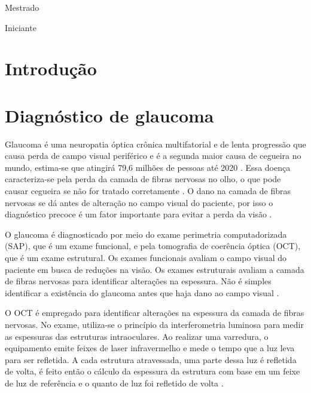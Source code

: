 \documentclass[conference]{IEEEtran}
\begin{document}
\renewcommand\IEEEkeywordsname{Classifica\c{c}\~{a}o}
\begin{IEEEkeywords}
	\label{classificacao}
	Mestrado
\end{IEEEkeywords}

\renewcommand\IEEEkeywordsname{Categoria}
\begin{IEEEkeywords}
	\label{Categoria}
	Iniciante 
\end{IEEEkeywords}

\IEEEpeerreviewmaketitle


\section{Introdução}


\section{Diagnóstico de glaucoma}


Glaucoma é uma neuropatia óptica crônica multifatorial e de lenta progressão que causa perda de campo visual periférico e é a segunda maior causa de cegueira no mundo, estima-se que atingirá 79,6 milhões de pessoas até 2020 \cite{Quigley2006}. Essa doença caracteriza-se pela perda da camada de fibras nervosas no olho, o que pode causar cegueira se não for tratado corretamente \cite{Quigley2011}. O dano na camada de fibras nervosas se dá antes de alteração no campo visual do paciente, por isso o diagnóstico precoce é um fator importante para evitar a perda da visão \cite{Malik2012}.

O glaucoma é diagnosticado por meio do exame perimetria computadorizada (SAP), que é um exame funcional, e pela tomografia de coerência óptica (OCT), que é um exame estrutural. Os exames funcionais avaliam o campo visual do paciente em busca de reduções na visão. Os exames estruturais avaliam a camada de fibras nervosas para identificar alterações na espessura. Não é simples identificar a existência do glaucoma antes que haja dano ao campo visual \cite{Populacoes2009}.

O OCT é empregado para identificar alterações na espessura da camada de fibras nervosas. No exame, utiliza-se o princípio da interferometria luminosa para medir as espessuras das estruturas intraoculares. Ao realizar uma varredura, o equipamento emite feixes de laser infravermelho e mede o tempo que a luz leva para ser refletida. A cada estrutura atravessada, uma parte dessa luz é refletida de volta, é feito então o cálculo da espessura da estrutura com base em um feixe de luz de referência e o quanto de luz foi refletido de volta \cite{huang1991}. 
\end{document}
